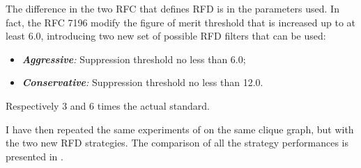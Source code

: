 The difference in the two \ac{RFC} that defines \ac{RFD} \cite{rfc2439,rfc7196}
is in the parameters used.
In fact, the \ac{RFC} \num{7196} modify the figure
of merit threshold that is increased up to at least \num{6.0}, introducing
two new set of possible \ac{RFD} filters that can be used:
\begin{itemize}
	\item \textit{\textbf{Aggressive}:} Suppression threshold no less than \num{6.0};
	\item \textit{\textbf{Conservative}:} Suppression threshold no less than \num{12.0}.
\end{itemize}
Respectively \num{3} and \num{6} times the actual standard.

I have then repeated the same experiments of  on the same
clique graph, but with the two new \ac{RFD} strategies.
The comparison of all the strategy performances is presented in .

